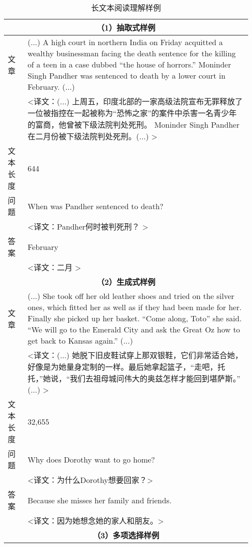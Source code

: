 \begin{table}[htbp]\scriptsize
    \centering
    \caption{长文本阅读理解样例}
    \begin{tabular}{p{48pt}|p{360pt}}
         \multicolumn{2}{c}{\bfseries （1）抽取式样例} \\
         \hline
         文章 & (...) A high court in northern India on Friday acquitted a wealthy businessman facing the death sentence for the killing of a teen in a case dubbed ``the house of horrors.'' Moninder Singh Pandher was sentenced to death by a lower court in February. (...) \\
          & <译文：(...) 上周五，印度北部的一家高级法院宣布无罪释放了一位被指控在一起被称为“恐怖之家”的案件中杀害一名青少年的富商，他曾被下级法院判处死刑。 Moninder Singh Pandher在二月份被下级法院判处死刑。(...) > \\
         \hline
         文本长度 & 644 \\
         \hline
         问题 & When was Pandher sentenced to death?  \\
          & <译文：Pandher何时被判死刑？ > \\
         \hline
         答案 & February  \\
          & <译文：二月 > \\
         \hline
         \multicolumn{2}{c}{\bfseries （2）生成式样例} \\
         \hline
         文章 & (...) She took off her old leather shoes and tried on the silver ones, which fitted her as well as if they had been made for her. Finally she picked up her basket. ``Come along, Toto'' she said. ``We will go to the Emerald City and ask the Great Oz how to get back to Kansas again.'' (...) \\
          & <译文：(...) 她脱下旧皮鞋试穿上那双银鞋，它们非常适合她，好像是为她量身定制的一样。最后她拿起篮子，“走吧，托托，”她说，“我们去祖母城问伟大的奥兹怎样才能回到堪萨斯。” (...) > \\
         \hline
         文本长度 & 32,655 \\
         \hline
         问题 & Why does Dorothy want to go home? \\
          & <译文：为什么Dorothy想要回家？> \\
         \hline
         答案 & Because she misses her family and friends.  \\
          & <译文：因为她想念她的家人和朋友。> \\
         \hline
         \multicolumn{2}{c}{\bfseries （3）多项选择样例} \\

\end{tabular}
\end{table}
